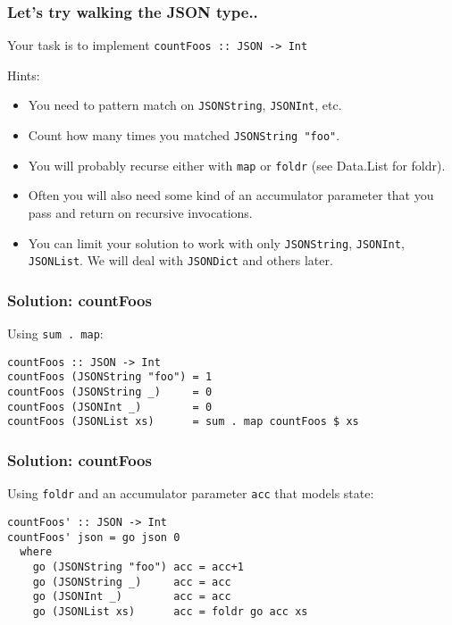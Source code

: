 \documentclass{beamer}
\begin{document}
\begin{frame}[fragile]
\frametitle{Let's try walking the JSON type..}

Your task is to implement \verb+countFoos :: JSON -> Int+

\bigskip

Hints:
\begin{itemize}
\item You need to pattern match on \verb+JSONString+, \verb+JSONInt+, etc.
\item Count how many times you matched \verb+JSONString "foo"+.
\item You will probably recurse either with \verb+map+ or \verb+foldr+
  (see Data.List for foldr).
\item Often you will also need some kind of an accumulator parameter
  that you pass and return on recursive invocations.
\item You can limit your solution to work with only \verb+JSONString+,
  \verb+JSONInt+, \verb+JSONList+.  We will deal with \verb+JSONDict+
  and others later.
\end{itemize}

\end{frame}


\begin{frame}[fragile]
\frametitle{Solution: countFoos}

Using \verb+sum . map+:

{\small
\begin{verbatim}
countFoos :: JSON -> Int
countFoos (JSONString "foo") = 1
countFoos (JSONString _)     = 0
countFoos (JSONInt _)        = 0
countFoos (JSONList xs)      = sum . map countFoos $ xs
\end{verbatim}
}
\end{frame}


\begin{frame}[fragile]
\frametitle{Solution: countFoos}

Using \verb+foldr+ and an accumulator parameter \verb+acc+ that models
state:

{\small
\begin{verbatim}
countFoos' :: JSON -> Int
countFoos' json = go json 0
  where
    go (JSONString "foo") acc = acc+1
    go (JSONString _)     acc = acc
    go (JSONInt _)        acc = acc
    go (JSONList xs)      acc = foldr go acc xs
\end{verbatim}
}

\end{frame}
\end{document}
